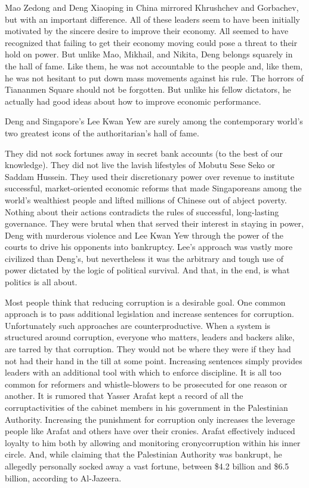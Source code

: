 \documentclass[10pt]{article}
\begin{document}
{\large Mao Zedong and Deng Xiaoping in China mirrored Khrushchev and Gorbachev,
but with an important difference. All of these leaders seem to have been
initially motivated by the sincere desire to improve their economy. All seemed to
have recognized that failing to get their economy moving could pose a threat to
their hold on power. But unlike Mao, Mikhail, and Nikita, Deng belongs squarely
in the hall of fame. Like them, he was not accountable to the people and, like
them, he was not hesitant to put down mass movements against his rule. The
horrors of Tiananmen Square should not be forgotten. But unlike his fellow
dictators, he actually had good ideas about how to improve economic performance.}

{\large Deng and Singapore's Lee Kwan Yew are surely among the contemporary
world's two greatest icons of the authoritarian's hall of fame.}

{\large They did not sock fortunes away in secret bank accounts (to the best of
our knowledge). They did not live the lavish lifestyles of Mobutu Sese Seko or
Saddam Hussein. They used their discretionary power over revenue to institute
successful, market-oriented economic reforms that made Singaporeans among the
world's wealthiest people and lifted millions of Chinese out of abject poverty.
Nothing about their actions contradicts the rules of successful, long-lasting
governance. They were brutal when that served their interest in staying in power,
Deng with murderous violence and Lee Kwan Yew through the power of the courts to
drive his opponents into bankruptcy. Lee's approach was vastly more civilized
than Deng's, but nevertheless it was the arbitrary and tough use of power
dictated by the logic of political survival. And that, in the end, is what
politics is all about.}

{\large Most people think that reducing corruption is a desirable goal. One
common approach is to pass additional legislation and increase sentences for
corruption. Unfortunately such approaches are counterproductive. When a system is
structured around corruption, everyone who matters, leaders and backers alike,
are tarred by that corruption. They would not be where they were if they had not
had their hand in the till at some point. Increasing sentences simply provides
leaders with an additional tool with which to enforce discipline. It is all too
common for reformers and whistle-blowers to be prosecuted for one reason or
another. It is rumored that Yasser Arafat kept a record of all the
corruptactivities of the cabinet members in his government in the Palestinian
Authority. Increasing the punishment for corruption only increases the leverage
people like Arafat and others have over their cronies. Arafat effectively induced
loyalty to him both by allowing and monitoring cronycorruption within his inner
circle. And, while claiming that the Palestinian Authority was bankrupt, he
allegedly personally socked away a vast fortune, between \$4.2 billion and \$6.5
billion, according to Al-Jazeera.}
\end{document}
